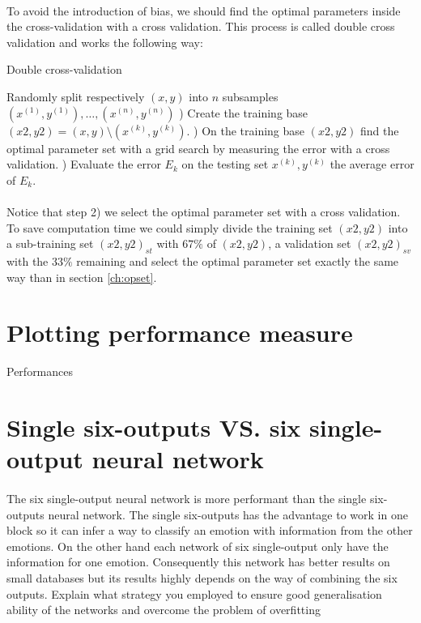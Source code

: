 \documentclass[a4paper,12pt,oneside,final]{report}
\begin{document}
\paragraph{}
To avoid the introduction of bias, we should find the optimal parameters inside the cross-validation with a cross validation. This process is called double cross validation and works the following way:
\begin{algorithm}[H]
\caption{Double cross-validation}
\label{al:dcv}
\begin{algorithmic}[1]
\STATE Randomly split respectively $(x, y)$ into $n$ subsamples $(x^{(1)}, y^{(1)}),\hdots,(x^{(n)}, y^{(n)})$
    ) Create the training base $(x2,y2)=(x, y)\setminus(x^{(k)}, y^{(k)})$.
    ) On the training base $(x2,y2)$ find the optimal parameter set with a grid search by measuring the error with a cross validation.
    ) Evaluate the error $E_k$ on the testing set $x^{(k)}, y^{(k)}$
\ENDFOR
{} the average error of $E_k$.
\end{algorithmic}
\end{algorithm}
\paragraph{}
Notice that step 2) we select the optimal parameter set with a cross validation. To save computation time we could simply divide the training set $(x2,y2)$ into a sub-training set $(x2,y2)_{st}$ with $67\%$ of $(x2,y2)$, a validation set $(x2,y2)_{sv}$ with the $33\%$ remaining and select the optimal parameter set exactly the same way than in section \ref{ch:opset}.

\section{Plotting performance measure}
{\color{red} Performances}

\section{Single six-outputs VS. six single-output neural network}
\paragraph{}
The six single-output neural network is more performant than the single six-outputs neural network. The single six-outputs has the advantage to work in one block so it can infer a way to classify an emotion with information from the other emotions. On the other hand each network of six single-output only have the information for one emotion. Consequently this network has better results on small databases but its results highly depends on the way of combining the six outputs.
Explain what strategy you employed to ensure good generalisation ability of the networks
and overcome the problem of overfitting
\end{document}
